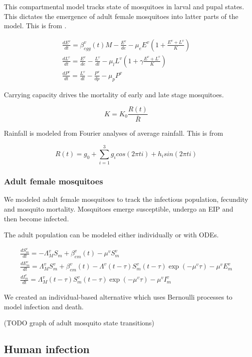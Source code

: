 \documentclass{bmcart}
\begin{document}
This compartmental model tracks state of mosquitoes in larval and pupal states. This dictates the emergence of adult female mosquitoes into latter parts of the model. This is from \cite{griffin_reducing_2010}.

\begin{gather*}
    \frac{dE^v}{dt} = \beta_{egg}^v(t) M - \frac{E^v}{de} - \mu_e E^v \left(1 + \frac{E^v + L^v}{K}\right) \\
    \frac{dL^v}{dt} = \frac{E^v}{de} - \frac{L^v}{dl} - \mu_l L^v \left(1 + \gamma \frac{E^v + L^v}{K}\right)  \\
    \frac{dP^v}{dt} = \frac{L^v}{dl} - \frac{P^v}{dp} - \mu_p P^v
\end{gather*}

Carrying capacity drives the mortality of early and late stage mosquitoes.

\[
K = K_0 \frac{R(t)}{\bar{R}}
\]

Rainfall is modeled from Fourier analyses of average rainfall. This is from \cite{winskill_us_2017}

\[
R(t) = g_0 + \sum_{i=1}^3 g_i cos(2\pi t i) + h_i sin(2\pi t i)
\]

\subsubsection*{Adult female mosquitoes}

We modeled adult female mosquitoes to track the infectious population, fecundity and mosquito mortality. Mosquitoes emerge susceptible, undergo an EIP and then become infected.

The adult population can be modeled either individually or with ODEs.

\begin{gather*}
    \frac{dS^v_m}{dt} = -\Lambda_M^v S_m + \beta_{em}^v(t) - \mu^v S^v_m \\
    \frac{dE^v_m}{dt} = \Lambda_M^v S^v_m + \beta_{em}^v(t) - \Lambda^v(t - \tau) S^v_m(t - \tau) \exp(-\mu^v\tau) - \mu^v E^v_m \\
    \frac{dI^v_m}{dt} = \Lambda_M^v(t - \tau) S^v_m(t - \tau) \exp(-\mu^v\tau) - \mu^v I^v_m
\end{gather*}

We created an individual-based alternative which uses Bernoulli processes to model infection and death.

(TODO graph of adult mosquito state transitions)

\subsection*{Human infection}
\end{document}
